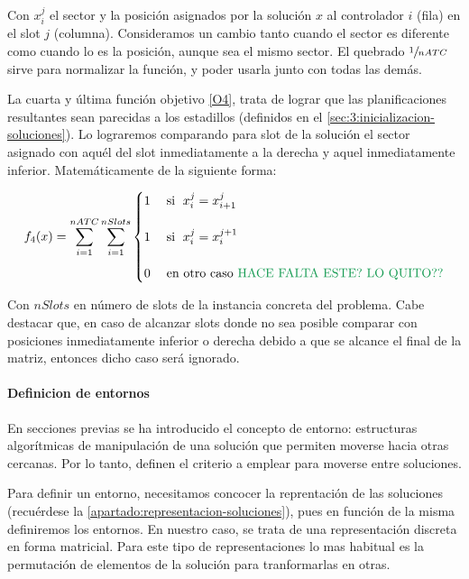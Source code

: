 Con $x_i^j$ el sector y la posición asignados por la solución $x$ al controlador $i$ (fila) en el slot $j$ (columna). Consideramos un cambio tanto cuando el sector es diferente como cuando lo es la posición, aunque sea el mismo sector.
El quebrado $\sfrac{1}{nATC}$ sirve para normalizar la función, y poder usarla junto con todas las demás. 

La cuarta y última función objetivo \ref{O4}, trata de lograr que las planificaciones resultantes sean parecidas a los estadillos (definidos en el \autoref{sec:3:inicializacion-soluciones}). Lo lograremos comparando para slot de la solución el sector asignado con aquél del slot inmediatamente a la derecha y aquel inmediatamente inferior. Matemáticamente de la siguiente forma:

\[
	f_4(x) = \sum_{i=1}^{nATC} \sum_{i=1}^{nSlots}
	\begin{cases}
		1 & \; \textrm{si } \; x_i^j = x_{i+1}^{j} \\
													\\
		1 & \; \textrm{si } \; x_i^j = x_{i}^{j+1}   \\
													  \\
		0 & \; \textrm{en otro caso }  \NOTE{\textrm{HACE FALTA ESTE? LO QUITO??}}
	\end{cases}
\]

Con $nSlots$ en número de slots de la instancia concreta del problema. Cabe destacar que, en caso de alcanzar slots
donde no sea posible comparar con posiciones inmediatamente inferior o derecha debido a que se alcance el final de la matriz, entonces dicho caso será ignorado.

\paragraph{Definicion de entornos}
En secciones previas se ha introducido el concepto de entorno: estructuras algorítmicas de manipulación de una solución que permiten moverse hacia otras cercanas. Por lo tanto, definen el criterio a emplear para moverse entre soluciones.

Para definir un entorno, necesitamos concocer la reprentación de las soluciones (recuérdese la \autoref{apartado:representacion-soluciones}), pues en función de la misma definiremos los entornos. En nuestro caso, se trata de una representación discreta en forma matricial. Para este tipo de representaciones lo mas habitual es la permutación de elementos de la solución para tranformarlas en otras.

